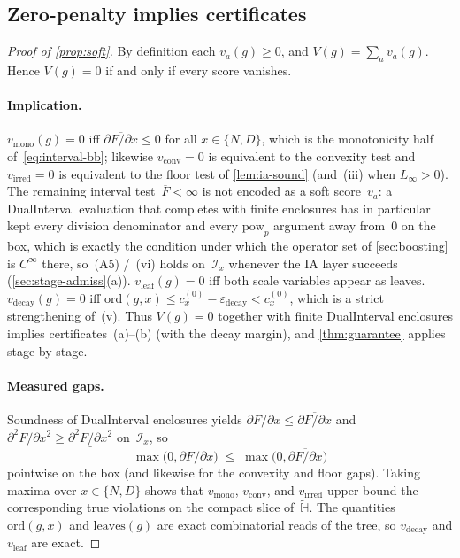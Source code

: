 \documentclass[11pt]{article}
\newcommand{\calI}{\mathcal{I}}
\newcommand{\bbH}{\mathbb{H}}
\theoremstyle{plain}
\theoremstyle{remark}
\begin{document}
\subsection{Zero-penalty implies certificates}\label{sec:soft-proof}
\begin{proof}[Proof of \cref{prop:soft}]
By definition each $v_a(g)\geq 0$, and $V(g)=\sum_a v_a(g)$.
Hence $V(g)=0$ if and only if every score vanishes.

\paragraph{Implication.}
$v_{\mathrm{mono}}(g)=0$ iff $\overline{\partial F/\partial x}\leq 0$ for all $x\in\{N,D\}$, which is the monotonicity half of~\eqref{eq:interval-bb}; likewise $v_{\mathrm{conv}}=0$ is equivalent to the convexity test and $v_{\mathrm{irred}}=0$ is equivalent to the floor test of \cref{lem:ia-sound} (and~(iii) when $L_\infty>0$).
The remaining interval test~$\overline{F}<\infty$ is not encoded as a soft score~$v_a$: a DualInterval evaluation that completes with finite enclosures has in particular kept every division denominator and every $\mathrm{pow}_p$ argument away from~$0$ on the box, which is exactly the condition under which the operator set of \cref{sec:boosting} is $C^\infty$ there, so~(A5) /~(vi) holds on~$\calI_x$ whenever the IA layer succeeds (\cref{sec:stage-admiss}(a)).
$v_{\mathrm{leaf}}(g)=0$ iff both scale variables appear as leaves.
$v_{\mathrm{decay}}(g)=0$ iff $\mathrm{ord}(g,x)\leq c_x^{(0)}-\varepsilon_{\mathrm{decay}}<c_x^{(0)}$, which is a strict strengthening of~(v).
Thus $V(g)=0$ together with finite DualInterval enclosures implies certificates~(a)--(b) (with the decay margin), and \cref{thm:guarantee} applies stage by stage.

\paragraph{Measured gaps.}
Soundness of DualInterval enclosures yields
$\partial F/\partial x\leq\overline{\partial F/\partial x}$ and
$\partial^2 F/\partial x^2\geq\underline{\partial^2 F/\partial x^2}$ on~$\calI_x$, so
\[
  \max\bigl(0,\partial F/\partial x\bigr)
  \;\leq\;
  \max\bigl(0,\overline{\partial F/\partial x}\bigr)
\]
pointwise on the box (and likewise for the convexity and floor gaps).
Taking maxima over $x\in\{N,D\}$ shows that $v_{\mathrm{mono}}$, $v_{\mathrm{conv}}$, and $v_{\mathrm{irred}}$ upper-bound the corresponding true violations on the compact slice of~$\widetilde{\bbH}$.
The quantities $\mathrm{ord}(g,x)$ and $\mathrm{leaves}(g)$ are exact combinatorial reads of the tree, so $v_{\mathrm{decay}}$ and $v_{\mathrm{leaf}}$ are exact.

\end{proof}
\end{document}
